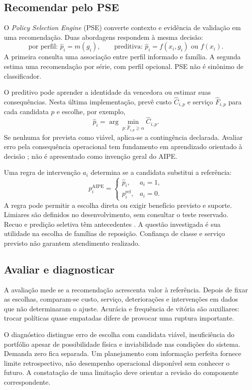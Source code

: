 \subsection{Recomendar pelo PSE}
O \textit{Policy Selection Engine} (PSE) converte contexto e evidência de validação em uma recomendação. Duas abordagens respondem à mesma decisão:
\[
 \text{por perfil: }\widehat p_i=m(g_i),\qquad
 \text{preditiva: }\widehat p_i=f(x_i,g_i)\text{ ou }f(x_i).
\]
A primeira consulta uma associação entre perfil informado e família. A segunda estima uma recomendação por série, com perfil opcional. PSE não é sinônimo de classificador.

O preditivo pode aprender a identidade da vencedora ou estimar suas consequências. Nesta última implementação, prevê custo $\widehat C_{i,p}$ e serviço $\widehat F_{i,p}$ para cada candidata $p$ e escolhe, por exemplo,
\[
 \widehat p_i=\arg\min_{p:\widehat F_{i,p}\geq\alpha}\widehat C_{i,p}.
\]
Se nenhuma for prevista como viável, aplica-se a contingência declarada. Avaliar erro pela consequência operacional tem fundamento em aprendizado orientado à decisão \citep{ElmachtoubGrigas2022SPO}; não é apresentado como invenção geral do AIPE.

Uma regra de intervenção $a_i$ determina se a candidata substitui a referência:
\[
 p_i^{\mathrm{AIPE}}=
 \begin{cases}\widehat p_i,&a_i=1,\\p_i^{\mathrm{ref}},&a_i=0.\end{cases}
\]
A regra pode permitir a escolha direta ou exigir benefício previsto e suporte. Limiares são definidos no desenvolvimento, sem consultar o teste reservado. Recuo e predição seletiva têm antecedentes \citep{GeifmanElYaniv2019SelectiveNet,Laroche2019SPIBB}. A questão investigada é sua utilidade na escolha de famílias de reposição. Confiança de classe e serviço previsto não garantem atendimento realizado.

\subsection{Avaliar e diagnosticar}
A avaliação mede se a recomendação acrescenta valor à referência. Depois de fixar as escolhas, comparam-se custo, serviço, deteriorações e intervenções em dados que não determinaram o ajuste. Acurácia e frequência de vitória são auxiliares: trocar políticas quase empatadas difere de provocar uma ruptura importante.

O diagnóstico distingue erro de escolha com candidata viável, insuficiência do portfólio apesar de possibilidade física e inviabilidade nas condições do sistema. Demanda zero fica separada. Um planejamento com informação perfeita fornece limite retrospectivo, não desempenho operacional disponível sem conhecer o futuro. A constatação de uma limitação deve orientar a revisão do componente correspondente.

